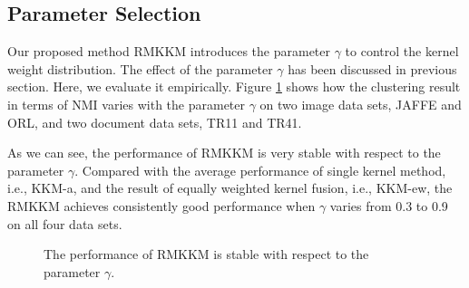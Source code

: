 \documentclass{article}
\begin{document}
\subsection{Parameter Selection}
Our proposed method RMKKM introduces the parameter $\gamma$ to control the kernel weight distribution. The effect of the parameter $\gamma$ has been discussed in previous section. Here, we evaluate it empirically. Figure \ref{fig:rmkkm_gamma} shows how the clustering result in terms of NMI varies with the parameter $\gamma$ on two image data sets, JAFFE and ORL, and two document data sets, TR11 and TR41.

As we can see, the performance of RMKKM is very stable with respect to the parameter $\gamma$. Compared with the average performance of single kernel method, i.e., KKM-a, and the result of equally weighted kernel fusion, i.e., KKM-ew, the RMKKM achieves consistently good performance when $\gamma$ varies from 0.3 to 0.9 on all four data sets.


\begin{figure}[ht]
\centering
{}
\hspace{-.25in}

\hspace{-.25in}
\caption{The performance of RMKKM is stable with respect to the parameter $\gamma$.}
\label{fig:rmkkm_gamma}
\end{figure}
\end{document}
